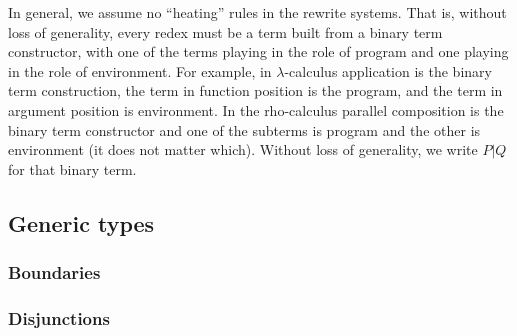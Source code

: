 In general, we assume no ``heating'' rules in the rewrite
systems. That is, without loss of generality, every redex must be a
term built from a binary term constructor, with one of the terms
playing in the role of program and one playing in the role of
environment. For example, in $\lambda$-calculus application is the
binary term construction, the term in function position is the
program, and the term in argument position is environment. In the
rho-calculus parallel composition is the binary term constructor and
one of the subterms is program and the other is environment (it does
not matter which). Without loss of generality, we write $P \mathsf{|} Q$ for that binary term.

\subsection{Generic types}

\subsubsection{Boundaries}

\subsubsection{Disjunctions}


